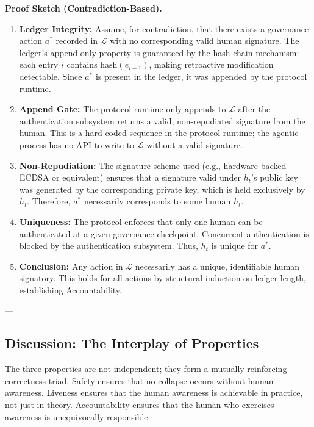 \bigskip
\noindent\textbf{Proof Sketch (Contradiction-Based).}
\begin{enumerate}
\item \textbf{Ledger Integrity:} Assume, for contradiction, that there exists a governance action $a^*$ recorded in $\mathcal{L}$ with no corresponding valid human signature. The ledger's append-only property is guaranteed by the hash-chain mechanism: each entry $i$ contains $\text{hash}(e_{i-1})$, making retroactive modification detectable. Since $a^*$ is present in the ledger, it was appended by the protocol runtime.

\item \textbf{Append Gate:} The protocol runtime only appends to $\mathcal{L}$ after the authentication subsystem returns a valid, non-repudiated signature from the human. This is a hard-coded sequence in the protocol runtime; the agentic process has no API to write to $\mathcal{L}$ without a valid signature.

\item \textbf{Non-Repudiation:} The signature scheme used (e.g., hardware-backed ECDSA or equivalent) ensures that a signature valid under $h_t$'s public key was generated by the corresponding private key, which is held exclusively by $h_t$. Therefore, $a^*$ necessarily corresponds to some human $h_t$.

\item \textbf{Uniqueness:} The protocol enforces that only one human can be authenticated at a given governance checkpoint. Concurrent authentication is blocked by the authentication subsystem. Thus, $h_t$ is unique for $a^*$.

\item \textbf{Conclusion:} Any action in $\mathcal{L}$ necessarily has a unique, identifiable human signatory. This holds for all actions by structural induction on ledger length, establishing Accountability.
\end{enumerate}

---

\subsection{Discussion: The Interplay of Properties}

The three properties are not independent; they form a mutually reinforcing correctness triad. Safety ensures that no collapse occurs without human awareness. Liveness ensures that the human awareness is achievable in practice, not just in theory. Accountability ensures that the human who exercises awareness is unequivocally responsible.

